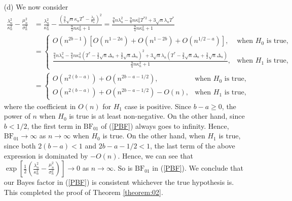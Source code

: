 \documentclass[11pt]{article}
\begin{document}
\begin{enumerate}
    \item[(d)] We now consider
    \begin{align*}
       \frac{\lambda_n^2}{\kappa_n^2}- \frac{\mu_n^2}{\sigma_n^2} &= \frac{\lambda_n^2}{\kappa_n^2} - \frac{\left(\frac{3}{2}\sqrt{n}\kappa_n T^*-\frac{ \lambda_n}{\kappa_n}\right)^2}{\frac{9}{4}n\kappa_n^2 +1} =\frac{\frac{9}{4}n\lambda_n^2 -\frac{9}{4}n\kappa_n^2T^{*2} +3\sqrt{n}\lambda_n T^*}{\frac{9}{4}n\kappa_n^2+1}\\
       &= \begin{cases}
           O(n^{2b-1})\left[O(n^{1-2a}) +O(n^{1-2b}) +O(n^{1/2-a})\right],&\text{when $H_0$ is true}, \\\frac{\frac{9}{4}n\lambda_n^2 -\frac{9}{4}n\kappa_n^2\left(T^{*} -\frac{3}{2}\sqrt{n}\Delta_n +\frac{3}{2}\sqrt{n} \Delta_n\right)^2 +3\sqrt{n}\lambda_n \left(T^* -\frac{3}{2}\sqrt{n}\Delta_n +\frac{3}{2}\sqrt{n} \Delta_n \right)}{\frac{9}{4}n\kappa_n^2+1},& \text{when $H_1$ is true},
       \end{cases}\\
       &= \begin{cases}
           O(n^{2(b-a)})+ O(n^{2b-a-1/2}),&\text{when $H_0$ is true}, \\O(n^{2(b-a)}) + O(n^{2b-a-1/2}) -O(n),& \text{when $H_1$ is true},
    \end{cases}
    \end{align*}
    where the coefficient in $O(n)$ for $H_1$ case is positive.  Since $b-a\ge 0$, the power of $n$ when $H_0$ is true is at least non-negative. On the other hand, since $b<1/2$, the first term in $\mathrm{BF}_{01}$ of (\ref{PBF}) always goes to infinity. Hence, $\mathrm{BF}_{01}\rightarrow\infty$ as $n\rightarrow\infty$ when $H_0$ is true. On the other hand, when $H_1$ is true, since both $2(b-a)<1$ and $2b-a-1/2<1$, the last term of the above expression is dominated by $-O(n)$. Hence, we can see that  $\exp\left[\frac{1}{2}\left( \frac{\lambda_n^2}{\kappa_n^2}- \frac{\mu_n^2}{\sigma_n^2}\right)\right]\rightarrow0$ as $n\rightarrow\infty$. So is $\mathrm{BF}_{01}$ in (\ref{PBF}). We conclude that our Bayes factor in (\ref{PBF}) is consistent whichever the true hypothesis is. This completed the proof of Theorem \ref{theorem:02}.
    \end{enumerate}
\end{document}

